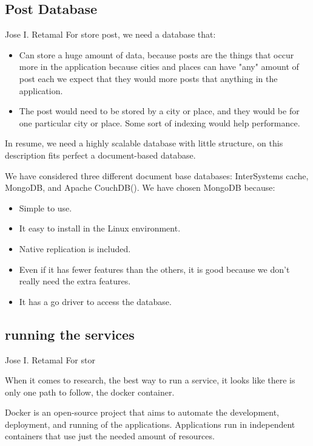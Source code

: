\subsection{Post Database}
Jose I. Retamal
\vskip 0.1in
\indent
\indent
For store post, we need a database that:
\begin{itemize}
	\item Can store a huge amount of data, because posts are the things that occur more in the application because cities and places can have "any" amount of post each we expect that they would more posts that anything in the application. 
	
	\item The post would need to be stored by a city or place, and they would be for one particular city or place. Some sort of indexing would help performance.


\end{itemize}

	In resume, we need a highly scalable database with little structure, on this description fits perfect a document-based database.

We have considered three different document base databases: InterSystems cache, MongoDB, and Apache CouchDB(). We have  chosen MongoDB because:

\begin{itemize}
	\item Simple to use.
	\item It easy to install in the Linux environment.
	\item Native replication is included.
	\item Even if it has fewer features than the others, it is good because we don't really need the extra features.
	\item It has a go driver to access the database. 
\end{itemize}


\subsection{running the services}
Jose I. Retamal
\vskip 0.1in
\indent
\indent
For stor

When it comes to research, the best way to run a service, it looks like there is only one path to follow, the docker container. 

Docker is an open-source project that aims to automate the development, deployment, and running of the applications. Applications run in independent containers that use just the needed amount of resources.

